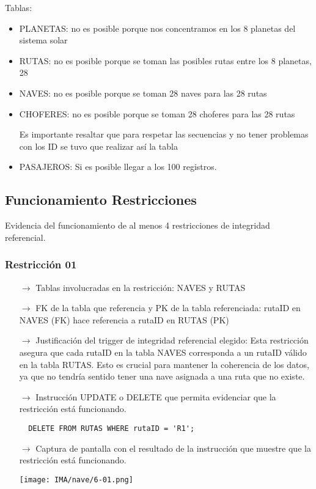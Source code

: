 Tablas:
\begin{itemize}
  \item PLANETAS: no es posible porque nos concentramos en los 8 planetas del sistema solar
  \item RUTAS: no es posible porque se toman las posibles rutas entre los 8 planetas, 28
  \item NAVES: no es posible porque se toman 28 naves para las 28 rutas
  \item CHOFERES: no es posible porque se toman 28 choferes para las 28 rutas
  
  Es importante resaltar que para respetar las secuencias y no tener problemas con los ID se tuvo que realizar así la tabla

  \item PASAJEROS: Si es posible llegar a los 100 registros.
\end{itemize}

\subsection{Funcionamiento Restricciones}

Evidencia del funcionamiento de al menos 4 restricciones de integridad referencial.

\subsubsection*{Restricción 01}

\begin{itemize}
  \item[$\rightarrow$] Tablas involucradas en la restricción: NAVES y RUTAS
  \item[$\rightarrow$] FK de la tabla que referencia y PK de la tabla referenciada: rutaID en NAVES (FK) hace referencia a rutaID en RUTAS (PK)
  \item[$\rightarrow$] Justificación del trigger de integridad referencial elegido: Esta restricción asegura que cada rutaID en la tabla NAVES corresponda a un rutaID válido en la tabla RUTAS. Esto es crucial para mantener la coherencia de los datos, ya que no tendría sentido tener una nave asignada a una ruta que no existe.
  \item[$\rightarrow$] Instrucción UPDATE o DELETE que permita evidenciar que la restricción está funcionando.
  \begin{verbatim}  
  DELETE FROM RUTAS WHERE rutaID = 'R1';  
  \end{verbatim}
  \item[$\rightarrow$] Captura de pantalla con el resultado de la instrucción que muestre que la restricción está funcionando.    
        \begin{center}
            \texttt{[image: IMA/nave/6-01.png]}
        \end{center}

\end{itemize}

